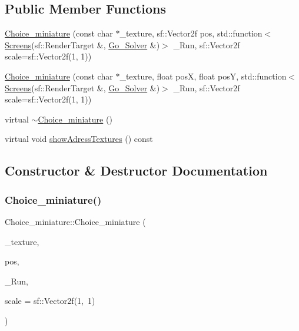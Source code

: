 \subsection*{Public Member Functions}
\begin{DoxyCompactItemize}
\item 
\hyperlink{class_choice__miniature_a156cdcafd4f44bdcf262669612fa8b82}{Choice\+\_\+miniature} (const char $\ast$\+\_\+texture, sf\+::\+Vector2f pos, std\+::function$<$ \hyperlink{_globals_8h_a3d5776bab98402b03be09156bacf4f68}{Screens}(sf\+::\+Render\+Target \&, \hyperlink{class_go___solver}{Go\+\_\+\+Solver} \&)$>$ \+\_\+\+Run, sf\+::\+Vector2f scale=sf\+::\+Vector2f(1, 1))
\item 
\hyperlink{class_choice__miniature_a0eee4352ef523c2d640a847ad016295d}{Choice\+\_\+miniature} (const char $\ast$\+\_\+texture, float posX, float posY, std\+::function$<$ \hyperlink{_globals_8h_a3d5776bab98402b03be09156bacf4f68}{Screens}(sf\+::\+Render\+Target \&, \hyperlink{class_go___solver}{Go\+\_\+\+Solver} \&)$>$ \+\_\+\+Run, sf\+::\+Vector2f scale=sf\+::\+Vector2f(1, 1))
\item 
virtual \hyperlink{class_choice__miniature_aa04b8d4c3ad3e99efad7ffe433d96fbe}{$\sim$\+Choice\+\_\+miniature} ()
\item 
virtual void \hyperlink{class_choice__miniature_a6f413024d98b0c334c5a3e6ec87eba9b}{show\+Adress\+Textures} () const
\end{DoxyCompactItemize}


\subsection{Constructor \& Destructor Documentation}
\mbox{\label{class_choice__miniature_a156cdcafd4f44bdcf262669612fa8b82}} 
\subsubsection{\texorpdfstring{Choice\+\_\+miniature()}{Choice\_miniature()}\hspace{0.1cm}{\footnotesize\ttfamily [1/2]}}
{\footnotesize\ttfamily Choice\+\_\+miniature\+::\+Choice\+\_\+miniature (\begin{DoxyParamCaption}\item[{const char $\ast$}]{\+\_\+texture,  }\item[{sf\+::\+Vector2f}]{pos,  }\item[{std\+::function$<$ \hyperlink{_globals_8h_a3d5776bab98402b03be09156bacf4f68}{Screens}(sf\+::\+Render\+Target \&, \hyperlink{class_go___solver}{Go\+\_\+\+Solver} \&)$>$}]{\+\_\+\+Run,  }\item[{sf\+::\+Vector2f}]{scale = {\ttfamily sf\+:\+:Vector2f(1,~1)} }\end{DoxyParamCaption})}

